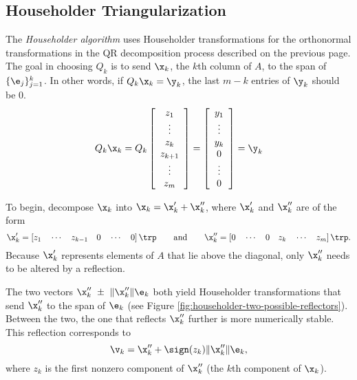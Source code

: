 \subsection*{Householder Triangularization} %

The \emph{Householder algorithm} uses Householder transformations for the orthonormal transformations in the QR decomposition process described on the previous page.
The goal in choosing $Q_k$ is to send $\x_k$, the $k$th column of $A$, to the span of $\{\e_j\}_{j=1}^k$.
In other words, if $Q_k\x_k = \y_k$, the last $m - k$ entries of $\y_k$ should be $0$.
%
\begin{align*}
Q_k\x_k = Q_k
\left[\begin{array}{c}
z_1 \\ \vdots \\ z_k \\ z_{k+1} \\ \vdots \\ z_m
\end{array}\right]
=
\left[\begin{array}{c}
y_1 \\ \vdots \\ y_k \\ 0 \\ \vdots \\ 0
\end{array}\right]
= \y_k
\end{align*}

To begin, decompose $\x_k$ into $\x_k = \x_k' + \x_k''$, where $\x_k'$ and $\x_k''$ are of the form
\[
\x_k' = \left[z_1\quad \cdots\quad z_{k-1}\quad 0\quad \cdots\quad 0\right]\trp
\qquad\text{and}\qquad
\x_k'' = \left[0\quad \cdots\quad 0\quad z_k\quad \cdots\quad z_m\right]\trp.
\]
Because $\x_k'$ represents elements of $A$ that lie above the diagonal, only $\x_k''$ needs to be altered by a reflection.

The two vectors $\x_k''\ \pm\ \|\x_k''\|\e_k$ both yield Householder transformations that send $\x_k''$ to the span of $\e_k$ (see Figure \ref{fig:householder-two-possible-reflectors}).
Between the two, the one that reflects $\x_k''$ further is more numerically stable.
This reflection corresponds to \[\v_k = \x_k'' + \sign(z_k)\|\x_k''\| \e_k,\] where $z_k$ is the first nonzero component of $\x_k''$ (the $k$th component of $\x_k$).

